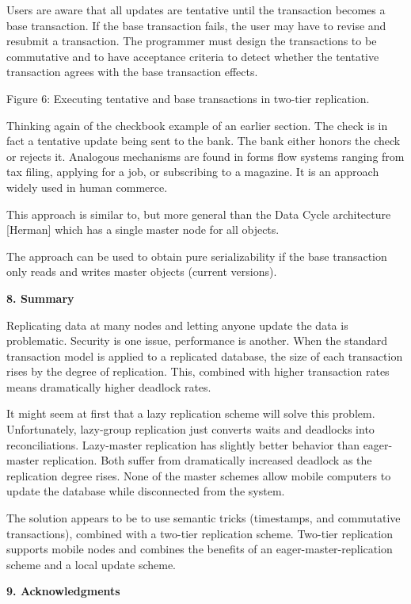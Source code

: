 \documentclass[a4paper,11pt,twoside,openright]{article}
\begin{document}
Users are aware that all updates are tentative until the transaction
becomes a base transaction. If the base transaction fails, the user may
have to revise and resubmit a transaction. The programmer must design
the transactions to be commutative and to have acceptance criteria to
detect whether the tentative transaction agrees with the base
transaction effects.

Figure 6: Executing tentative and base transactions in two-tier
replication.

Thinking again of the checkbook example of an earlier section. The check
is in fact a tentative update being sent to the bank. The bank either
honors the check or rejects it. Analogous mechanisms are found in forms
flow systems ranging from tax filing, applying for a job, or subscribing
to a magazine. It is an approach widely used in human commerce.

This approach is similar to, but more general than the Data Cycle
architecture {[}Herman{]} which has a single master node for all
objects.

The approach can be used to obtain pure serializability if the base
transaction only reads and writes master objects (current versions).

\textbf{8. Summary}

Replicating data at many nodes and letting anyone update the data is
problematic. Security is one issue, performance is another. When the
standard transaction model is applied to a replicated database, the size
of each transaction rises by the degree of replication. This, combined
with higher transaction rates means dramatically higher deadlock rates.

It might seem at first that a lazy replication scheme will solve this
problem. Unfortunately, lazy-group replication just converts waits and
deadlocks into reconciliations. Lazy-master replication has slightly
better behavior than eager-master replication. Both suffer from
dramatically increased deadlock as the replication degree rises. None of
the master schemes allow mobile computers to update the database while
disconnected from the system.

The solution appears to be to use semantic tricks (timestamps, and
commutative transactions), combined with a two-tier replication scheme.
Two-tier replication supports mobile nodes and combines the benefits of
an eager-master-replication scheme and a local update scheme.

\textbf{9. Acknowledgments}
\end{document}

